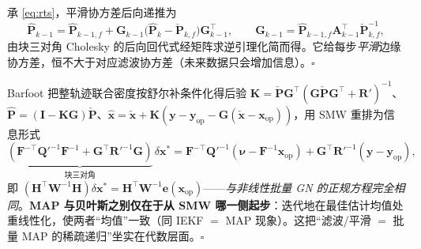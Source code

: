 \begin{derivation}
承 \cref{eq:rts}，平滑协方差后向递推为
\[
  \hat{\mathbf{P}}_{k-1}=\hat{\mathbf{P}}_{k-1,f}+\mathbf{G}_{k-1}\big(\hat{\mathbf{P}}_k-\check{\mathbf{P}}_{k,f}\big)\mathbf{G}_{k-1}^\top,\qquad
  \mathbf{G}_{k-1}=\hat{\mathbf{P}}_{k-1,f}\mathbf{A}_{k-1}^\top\check{\mathbf{P}}_{k,f}^{-1},
\]
由块三对角 Cholesky 的后向回代式经矩阵求逆引理化简而得\cite{barfoot2024state}。它给每步\emph{平滑}边缘协方差，恒不大于对应滤波协方差（未来数据只会增加信息）。\hfill$\square$
\end{derivation}

\begin{derivation}
Barfoot\cite{barfoot2024state} 把整轨迹联合密度按舒尔补条件化得后验 $\mathbf{K}=\check{\mathbf{P}}\mathbf{G}^\top(\mathbf{G}\check{\mathbf{P}}\mathbf{G}^\top+\mathbf{R}')^{-1}$、$\hat{\mathbf{P}}=(\mathbf{I}-\mathbf{K}\mathbf{G})\check{\mathbf{P}}$、$\hat{\mathbf{x}}=\check{\mathbf{x}}+\mathbf{K}(\mathbf{y}-\mathbf{y}_{\text{op}}-\mathbf{G}(\check{\mathbf{x}}-\mathbf{x}_{\text{op}}))$，用 SMW 重排为信息形式
\[
  \underbrace{(\mathbf{F}^{-\top}\mathbf{Q}'^{-1}\mathbf{F}^{-1}+\mathbf{G}^\top\mathbf{R}'^{-1}\mathbf{G})}_{\text{块三对角}}\,\delta\mathbf{x}^*=\mathbf{F}^{-\top}\mathbf{Q}'^{-1}(\boldsymbol{\nu}-\mathbf{F}^{-1}\mathbf{x}_{\text{op}})+\mathbf{G}^\top\mathbf{R}'^{-1}(\mathbf{y}-\mathbf{y}_{\text{op}}),
\]
即 $(\mathbf{H}^\top\mathbf{W}^{-1}\mathbf{H})\delta\mathbf{x}^*=\mathbf{H}^\top\mathbf{W}^{-1}\mathbf{e}(\mathbf{x}_{\text{op}})$——\emph{与非线性批量 GN 的正规方程完全相同}。\textbf{MAP 与贝叶斯之别仅在于从 SMW 哪一侧起步}：迭代地在最佳估计均值处重线性化，使两者“均值”一致（同 IEKF $=$ MAP 现象）。这把“滤波/平滑 $=$ 批量 MAP 的稀疏递归”坐实在代数层面。\hfill$\square$
\end{derivation}

